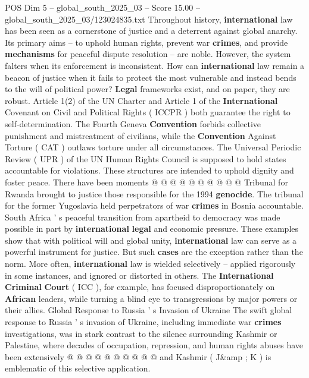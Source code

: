 \begin{textsample}{POS Dim 5 – global\_south\_2025\_03 – Score 15.00 – global\_south\_2025\_03/123024835.txt}  \label{ex:f5_pos_185}
Throughout history, \textbf{international} law has been seen as a cornerstone of justice and a deterrent against global anarchy.
Its primary aims -- to uphold human rights, prevent war \textbf{crimes}, and provide \textbf{mechanisms} for peaceful dispute resolution -- are noble.
However, the system falters when its enforcement is inconsistent.
How can \textbf{international} law remain a beacon of justice when it fails to protect the most vulnerable and instead bends to the will of political power? \textbf{Legal} frameworks exist, and on paper, they are robust.
Article 1(2) of the UN Charter and Article 1 of the \textbf{International} Covenant on Civil and Political Rights ( ICCPR ) both guarantee the right to self-determination.
The Fourth Geneva \textbf{Convention} forbids collective punishment and mistreatment of civilians, while the \textbf{Convention} Against Torture ( CAT ) outlaws torture under all circumstances.
The Universal Periodic Review ( UPR ) of the UN Human Rights Council is supposed to hold states accountable for violations.
These structures are intended to uphold dignity and foster peace.
There have been moments @ @ @ @ @ @ @ @ @ @ Tribunal for Rwanda brought to justice those responsible for the 1994 \textbf{genocide}.
The tribunal for the former Yugoslavia held perpetrators of war \textbf{crimes} in Bosnia accountable.
South Africa ' s peaceful transition from apartheid to democracy was made possible in part by \textbf{international} \textbf{legal} and economic pressure.
These examples show that with political will and global unity, \textbf{international} law can serve as a powerful instrument for justice.
But such \textbf{cases} are the exception rather than the norm.
More often, \textbf{international} law is wielded selectively -- applied rigorously in some instances, and ignored or distorted in others.
The \textbf{International} \textbf{Criminal} \textbf{Court} ( ICC ), for example, has focused disproportionately on \textbf{African} leaders, while turning a blind eye to transgressions by major powers or their allies.
Global Response to Russia ' s Invasion of Ukraine The swift global response to Russia ' s invasion of Ukraine, including immediate war \textbf{crimes} investigations, was in stark contrast to the silence surrounding Kashmir or Palestine, where decades of occupation, repression, and human rights abuses have been extensively @ @ @ @ @ @ @ @ @ @ and Kashmir ( J\&amp ; K ) is emblematic of this selective application.

\end{textsample}

